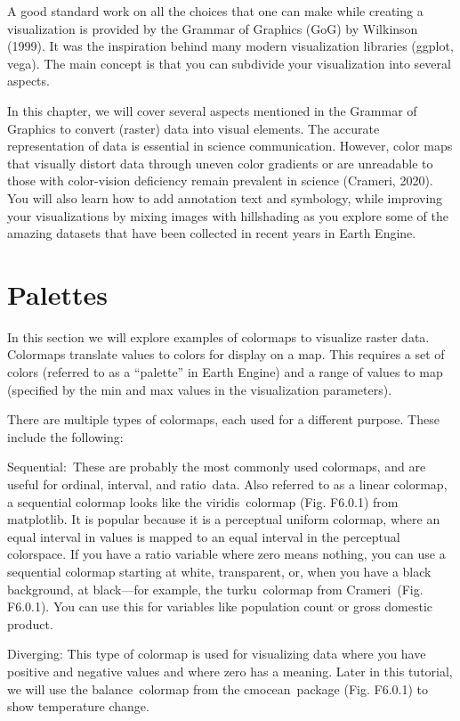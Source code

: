 \documentclass[
  letterpaper,
  DIV=11,
  numbers=noendperiod]{scrreprt}
\begin{document}
A good standard work on all the choices that one can make while creating
a visualization is provided by the Grammar of Graphics (GoG) by
Wilkinson (1999). It was the inspiration behind many modern
visualization libraries (ggplot, vega). The main concept is that you can
subdivide your visualization into several aspects.

In this chapter, we will cover several aspects mentioned in the Grammar
of Graphics to convert (raster) data into visual elements. The accurate
representation of data is essential in science communication. However,
color maps that visually distort data through uneven color gradients or
are unreadable to those with color-vision deficiency remain prevalent in
science (Crameri, 2020). You will also learn how to add annotation text
and symbology, while improving your visualizations by mixing images with
hillshading as you explore some of the amazing datasets that have been
collected in recent years in Earth Engine.

\hypertarget{palettes}{%
\section{Palettes}\label{palettes}}

In this section we will explore examples of colormaps to visualize
raster data. Colormaps translate values to colors for display on a map.
This requires a set of colors (referred to as a ``palette'' in Earth
Engine) and a range of values to map (specified by the min and max
values in the visualization parameters).

There are multiple types of colormaps, each used for a different
purpose. These include the following:

Sequential:~These are probably the most commonly used colormaps, and are
useful for ordinal, interval, and ratio~data. Also referred to as a
linear colormap, a sequential colormap looks like the viridis~colormap
(Fig. F6.0.1) from matplotlib. It is popular because it is a perceptual
uniform colormap, where an equal interval in values is mapped to an
equal interval in the perceptual colorspace. If you have a ratio
variable where zero means nothing, you can use a sequential colormap
starting at white, transparent, or, when you have a black background, at
black---for example, the turku~colormap from Crameri~(Fig. F6.0.1). You
can use this for variables like population count or gross domestic
product.

Diverging: This type of colormap is used for visualizing data where you
have positive and negative values and where zero has a meaning. Later in
this tutorial, we will use the balance~colormap from the cmocean~package
(Fig. F6.0.1) to show temperature change.
\end{document}

